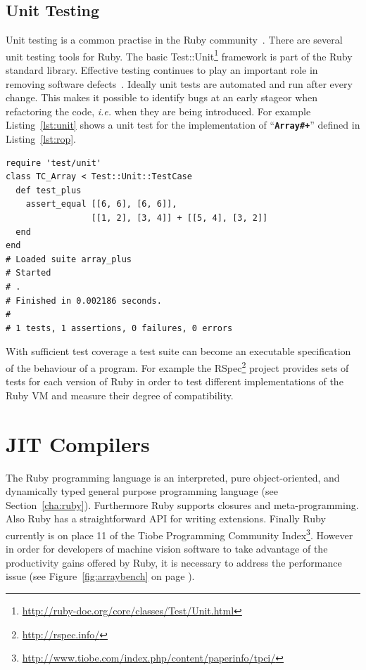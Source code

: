 \documentclass[12pt,a4paper,oneside,openright]{book}
\newcommand{\Eg}{For ex\-am\-ple }
\newcommand{\ie}{\emph{i.e.} }
\newcommand{\sct}[1]{Section~\ref{cha:#1}}
\newcommand{\fig}[1]{Figure~\ref{fig:#1}}
\newcommand{\lst}[1]{Listing~\ref{lst:#1}}
\newcommand{\code}[1]{``\texttt{\textbf{\textcolor{codegray}{\small{#1}}}}''}
\begin{document}
\begin{CJK}{UTF8}{}
\subsection{Unit Testing}\label{cha:unittesting}
Unit testing is a common practise in the Ruby community~\citep{martin2009}. There are several unit testing tools for Ruby. The basic Test::Unit\footnote{\url{http://ruby-doc.org/core/classes/Test/Unit.html}} framework is part of the Ruby standard library. Effective testing continues to play an important role in removing software defects~\citep{unittest}. Ideally unit tests are automated and run after every change. This makes it possible to identify bugs at an early stageor when refactoring the code, \ie when they are being introduced. \Eg \lst{unit} shows a unit test for the implementation of \code{Array\#+} defined in \lst{rop}.
\lstset{language=Ruby,frame=single,numbers=none}
\begin{lstlisting}[float=htbp,caption={Unit test for \code{Array\#+} defined in \lst{rop}},label=lst:unit]
require 'test/unit'
class TC_Array < Test::Unit::TestCase
  def test_plus
    assert_equal [[6, 6], [6, 6]], 
                 [[1, 2], [3, 4]] + [[5, 4], [3, 2]]
  end
end
# Loaded suite array_plus
# Started
# .
# Finished in 0.002186 seconds.
#
# 1 tests, 1 assertions, 0 failures, 0 errors
\end{lstlisting}

With sufficient test coverage a test suite can become an executable specification of the behaviour of a program. \Eg the RSpec\footnote{\url{http://rspec.info/}} project provides sets of tests for each version of Ruby in order to test different implementations of the Ruby \ac{VM} and measure their degree of compatibility.

\section{\acs{JIT} Compilers}\label{cha:jits}
The Ruby programming language is an interpreted, pure object-oriented, and dynamically typed general purpose programming language (see \sct{ruby}). Furthermore Ruby supports closures and meta-programming. Also Ruby has a straightforward \ac{API} for writing extensions. Finally Ruby currently is on place 11 of the Tiobe Programming Community Index\footnote{\url{http://www.tiobe.com/index.php/content/paperinfo/tpci/}}. However in order for developers of machine vision software to take advantage of the productivity gains offered by Ruby, it is necessary to address the performance issue (see \fig{arraybench} on page \pageref{fig:arraybench}).


\end{CJK}
\end{document}
